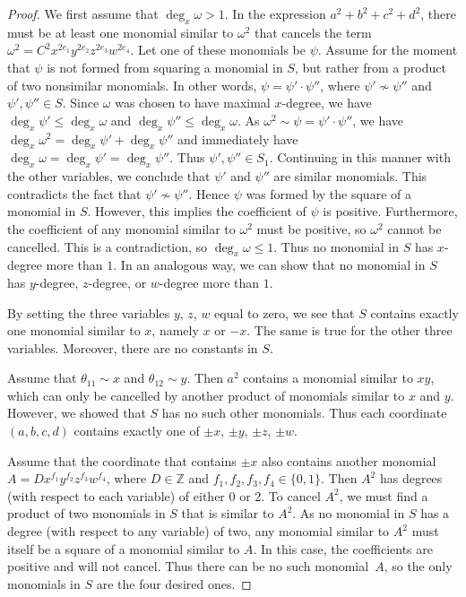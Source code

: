 \documentclass[12pt,table]{article}
\numberwithin{equation}{section}
\newcommand{\Zzz}{\mathbb Z}
\begin{document}
\begin{landscape}
{{\begin{proof}
We first assume that $\deg_x \omega > 1 $.
In the expression  
$a^2 + b^2 + c^2 + d^2$, there must be at least one monomial similar to $ \omega^2 $
that cancels the term $ \omega^2 = C^2x^{2e_1}y^{2e_2}z^{2e_3}w^{2e_4}$.
Let one of these monomials be $ \psi $. Assume for the moment that $ \psi $
is not formed from squaring a monomial in $S$, but rather
from a product of two nonsimilar monomials.
In other words, $ \psi = \psi' \cdot \psi''$, where $ \psi' \nsim \psi'' $
and $ \psi' , \psi'' \in S $. Since $\omega$ was chosen to have maximal $x$-degree,
we have $\deg_x \psi' \leq \deg_x \omega$ and
$\deg_x \psi'' \leq \deg_x \omega$.
As $\omega^2 \sim \psi = \psi' \cdot \psi''$,
we have $ \deg_x \omega^2 = \deg_x \psi' + \deg_x \psi''$
and immediately have $ \deg_x \omega = \deg_x \psi' = \deg_x \psi'' $.
Thus $ \psi' , \psi'' \in S_1 $. Continuing in this manner
with the other variables, we
conclude that $ \psi' $ and $ \psi'' $ are similar monomials.
This contradicts the fact that $ \psi' \nsim \psi'' $.
Hence $ \psi $ was
formed by the square of a monomial in $ S $. However, this implies the coefficient
of $ \psi $ is positive. Furthermore, the coefficient of
any monomial similar to $ \omega^2 $ must be positive,
so $ \omega^2 $ cannot be cancelled. This is
a contradiction, so $ \deg_x \omega \leq 1 $. Thus no monomial in $S$ has $x$-degree more
than $1$. In an analogous way, we can show that no monomial in $S$ has $y$-degree, $z$-degree,
or $w$-degree more than $1$.

By setting the three variables $y$, $z$, $w$ equal to zero, we see that $ S $ contains
exactly one monomial similar to $ x $, namely $ x$ or $ -x $. The same is true for
the other three variables. Moreover, there are no constants in $ S $.

Assume that $\theta_{11} \sim x$ and $\theta_{12} \sim y$.
Then $a^2$ contains
a monomial similar to $ xy $, which can only be cancelled by another product of monomials similar to
$ x $ and $y$. However, we showed that $ S $ has no such other monomials.
Thus each coordinate $ (a, b, c, d) $ contains exactly one of $ \pm x$, $\pm y$, $\pm z$, $\pm w $.


Assume that the coordinate that contains $ \pm x $ also contains
another monomial $ A = Dx^{f_1}y^{f_2}z^{f_3}w^{f_4}$, where $ D \in \Zzz $
and $ f_1,f_2,f_3,f_4 \in \{0,1\} $. Then $ A^2 $ has degrees (with respect to
each variable) of either 0 or 2. To cancel $ A^2 $, we must find a product of two
monomials in $ S $ that is similar to $ A^2 $. As no monomial in $ S $ has a degree
(with respect to any variable) of two, any monomial similar to $ A^2 $ must itself be
a square of a monomial similar to $ A $. In this case, the coefficients are
positive and will not cancel. Thus there can be no such monomial~$ A $, so the only monomials
in $ S $ are the four desired ones.
\end{proof}

}}
\end{landscape}
\end{document}
